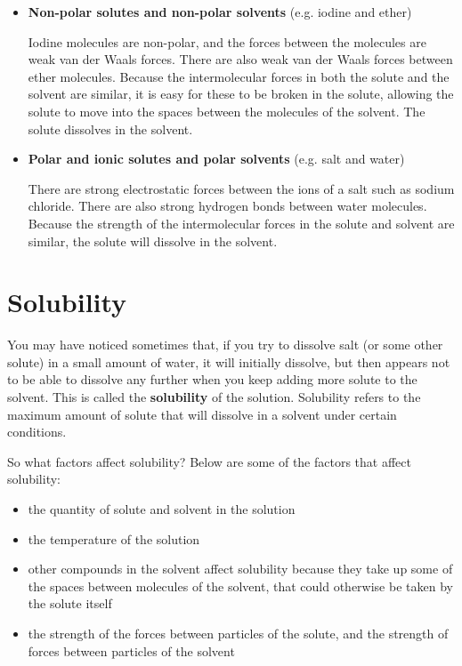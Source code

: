 \begin{itemize}
\item{\textbf{Non-polar solutes and non-polar solvents} (e.g. iodine and ether)

Iodine molecules are non-polar, and the forces between the molecules are weak van der Waals forces. There are also weak van der Waals forces between ether molecules. Because the intermolecular forces in both the solute and the solvent are similar, it is easy for these to be broken in the solute, allowing the solute to move into the spaces between the molecules of the solvent. The solute dissolves in the solvent.\\}

\item{\textbf{Polar and ionic solutes and polar solvents} (e.g. salt and water})

There are strong electrostatic forces between the ions of a salt such as sodium chloride. There are also strong hydrogen bonds between water molecules. Because the strength of the intermolecular forces in the solute and solvent are similar, the solute will dissolve in the solvent. 
\end{itemize}

\section{Solubility}
\label{sec:soln:solubility}

You may have noticed sometimes that, if you try to dissolve salt (or some other solute) in a small amount of water, it will initially dissolve, but then appears not to be able to dissolve any further when you keep adding more solute to the solvent. This is called the \textbf{solubility} of the solution. Solubility refers to the maximum amount of solute that will dissolve in a solvent under certain conditions. 


So what factors affect solubility? Below are some of the factors that affect solubility:

\begin{itemize}
\item{the quantity of solute and solvent in the solution}
\item{the temperature of the solution}
\item{other compounds in the solvent affect solubility because they take up some of the spaces between molecules of the solvent, that could otherwise be taken by the solute itself}
\item{the strength of the forces between particles of the solute, and the strength of forces between particles of the solvent}
\end{itemize}

